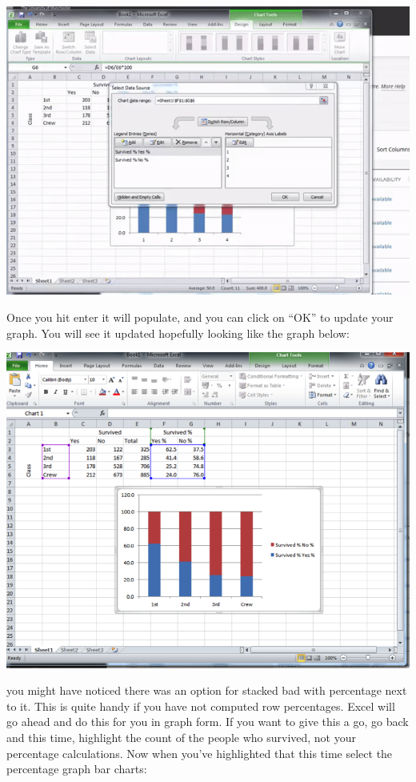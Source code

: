\documentclass[]{book}
\theoremstyle{definition}
\theoremstyle{definition}
\theoremstyle{definition}
\theoremstyle{remark}
\begin{document}
\includegraphics{imgs/add_labels.gif}

Once you hit enter it will populate, and you can click on ``OK'' to
update your graph. You will see it updated hopefully looking like the
graph below:

\includegraphics{imgs/stacked_col_5.png}

you might have noticed there was an option for stacked bad with
percentage next to it. This is quite handy if you have not computed row
percentages. Excel will go ahead and do this for you in graph form. If
you want to give this a go, go back and this time, highlight the count
of the people who survived, not your percentage calculations. Now when
you've highlighted that this time select the percentage graph bar
charts:
\end{document}
